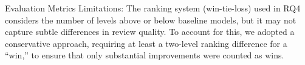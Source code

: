Evaluation Metrics Limitations: The ranking system (win-tie-loss) used in RQ4 considers the number of levels above or below baseline models, but it may not capture subtle differences in review quality. To account for this, we adopted a conservative approach, requiring at least a two-level ranking difference for a “win,” to ensure that only substantial improvements were counted as wins.







                            
                            
         


